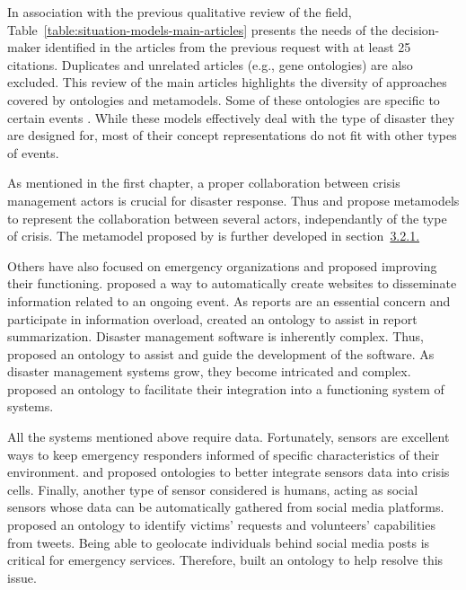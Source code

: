 In association with the previous qualitative review of the field, Table~\ref{table:situation-models-main-articles} presents the needs of the decision-maker identified in the articles from the previous request with at least 25 citations.
Duplicates and unrelated articles (e.g., gene ontologies) are also excluded.
This review of the main articles highlights the diversity of approaches covered by ontologies and metamodels.
Some of these ontologies are specific to certain events \parencite{xuModelingRepresentationEarthquake2014,qiuIntegratedFloodManagement2017,jungOntologydrivenSlopeModeling2015}.
While these models effectively deal with the type of disaster they are designed for, most of their concept representations do not fit with other types of events.

As mentioned in the first chapter, a proper collaboration between crisis management actors is crucial for disaster response.
Thus \textcite{benabenMetamodelItsOntology2008} and \textcite{othmanDevelopmentValidationDisaster2014} propose metamodels to represent the collaboration between several actors, independantly of the type of crisis.
The metamodel proposed by \citeauthor{benabenMetamodelItsOntology2008} is further developed in section~\hyperref[sec:crisismetamodel]{3.2.1.}

Others have also focused on emergency organizations and proposed improving their functioning.
\textcite{chouOntologyDevelopingWeb2011} proposed a way to automatically create websites to disseminate information related to an ongoing event.
As reports are an essential concern and participate in information overload, \textcite{liOntologyenrichedMultiDocumentSummarization2010} created an ontology to assist in report summarization.
Disaster management software is inherently complex.
Thus, \textcite{babitskiSoKNOSUsingSemantic2011} proposed an ontology to assist and guide the development of the software.
As disaster management systems grow, they become intricated and complex. \textcite{madniSystemsIntegrationKey2014} proposed an ontology to facilitate their integration into a functioning system of systems.

All the systems mentioned above require data.
Fortunately, sensors are excellent ways to keep emergency responders informed of specific characteristics of their environment.
\textcite{posladSemanticIoTEarly2015} and \textcite{babitskiOntologybasedIntegrationSensor2009} proposed ontologies to better integrate sensors data into crisis cells.
Finally, another type of sensor considered is humans, acting as social sensors whose data can be automatically gathered from social media platforms.
\textcite{purohitIdentifyingSeekersSuppliers2014} proposed an ontology to identify victims' requests and volunteers' capabilities from tweets.
Being able to geolocate individuals behind social media posts is critical for emergency services.
Therefore, \textcite{ghahremanlouGeotaggingTwitterMessages2014} built an ontology to help resolve this issue.

